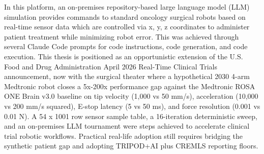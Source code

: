 
In this platform, an on-premises repository-based large language model (LLM) simulation provides commands to standard oncology surgical robots based on real-time sensor data which are controlled via x, y, z coordinates to administer
patient treatment while minimizing robot error. This was achieved through several Claude Code prompts for code instructions, code generation, and code execution. This thesis is positioned as an opportunistic extension of the U.S. Food and Drug Administration April 2026 Real-Time Clinical Trials announcement, now with the surgical theater where a hypothetical 2030 4-arm Medtronic robot closes a 5x-200x performance gap against the Medtronic ROSA ONE Brain v3.0 baseline on tip velocity (1,000 vs 50 mm/s), acceleration (10,000 vs 200 mm/s squared), E-stop latency (5 vs 50 ms), and force resolution (0.001 vs 0.01 N). A
54 x 1001 row sensor sample table, a 16-iteration deterministic sweep, and an on-premises LLM tournament were steps achieved to accelerate clinical trial robotic workflows. Practical real-life adoption still requires bridging the synthetic patient gap and adopting TRIPOD+AI plus CREMLS reporting floors.
